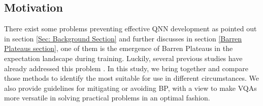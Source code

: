 \subsection{Motivation}
There exist some problems preventing effective QNN development as pointed out in section \ref{Sec: Background Section} and further discusses in section \ref{Barren Plateaus section}, one of them is the emergence of Barren Plateaus in the expectation landscape during training.
Luckily, several previous studies have already addressed this problem \cite{cerezoCostFunctionDependent2021,skolikLayerwiseLearningQuantum2021,grantInitializationStrategyAddressing2019}.
In this study, we bring together and compare those methods to identify the most suitable for use in different circumstances.
We also provide guidelines for mitigating or avoiding BP, with a view to make VQAs more versatile in solving practical problems in an optimal fashion.